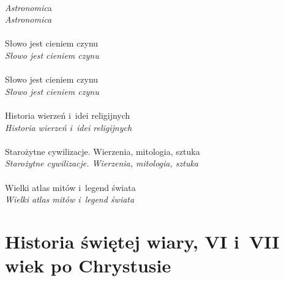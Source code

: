 \documentclass[a4paper,11pt]{article}
\begin{document}
 \\
\Jest  \textit{Astronomic}a \\
\Powin \textit{Astronomica} \\
 \\
\Jest  Słowo jest cieniem czynu \\
\Powin \textit{Słowo jest cieniem czynu} \\
 \\
\Jest  Słowo jest cieniem czynu \\
\Powin \textit{Słowo jest cieniem czynu} \\
 \\
\Jest  Historia wierzeń i~idei religijnych \\
\Powin \textit{Historia wierzeń i~idei religijnych} \\
 \\
\Jest  Starożytne cywilizacje. Wierzenia, mitologia, sztuka \\
\Powin \textit{Starożytne cywilizacje. Wierzenia, mitologia, sztuka} \\
 \\
\Jest  Wielki atlas mitów i~legend świata \\
\Powin \textit{Wielki atlas mitów i~legend świata} \\













\newpage

\section{Historia świętej wiary, VI i~VII wiek po Chrystusie}

\vspace{\spaceTwo}




\vspace{0em}


\end{document}
